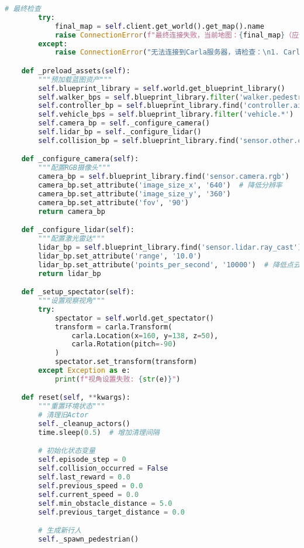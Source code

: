 \begin{lstlisting}[language=Python]
        # 最终检查
        try:
            final_map = self.client.get_world().get_map().name
            raise ConnectionError(f"最终连接失败，当前地图：{final_map}（应使用Town01）")
        except:
            raise ConnectionError("无法连接到Carla服务器，请检查：\n1. Carla服务器是否运行\n2. 端口2000是否可用")

    def _preload_assets(self):
        """预加载蓝图资产"""
        self.blueprint_library = self.world.get_blueprint_library()
        self.walker_bps = self.blueprint_library.filter('walker.pedestrian.*')
        self.controller_bp = self.blueprint_library.find('controller.ai.walker')
        self.vehicle_bps = self.blueprint_library.filter('vehicle.*')
        self.camera_bp = self._configure_camera()
        self.lidar_bp = self._configure_lidar()
        self.collision_bp = self.blueprint_library.find('sensor.other.collision')

    def _configure_camera(self):
        """配置RGB摄像头"""
        camera_bp = self.blueprint_library.find('sensor.camera.rgb')
        camera_bp.set_attribute('image_size_x', '640')  # 降低分辨率
        camera_bp.set_attribute('image_size_y', '360')
        camera_bp.set_attribute('fov', '90')
        return camera_bp

    def _configure_lidar(self):
        """配置激光雷达"""
        lidar_bp = self.blueprint_library.find('sensor.lidar.ray_cast')
        lidar_bp.set_attribute('range', '10.0')
        lidar_bp.set_attribute('points_per_second', '10000')  # 降低点云密度
        return lidar_bp

    def _setup_spectator(self):
        """设置观察视角"""
        try:
            spectator = self.world.get_spectator()
            transform = carla.Transform(
                carla.Location(x=160, y=138, z=50),
                carla.Rotation(pitch=-90)
            )
            spectator.set_transform(transform)
        except Exception as e:
            print(f"视角设置失败: {str(e)}")

    def reset(self, **kwargs):
        """重置环境状态"""
        # 清理旧Actor
        self._cleanup_actors()
        time.sleep(0.5)  # 增加清理间隔

        # 初始化状态变量
        self.episode_step = 0
        self.collision_occurred = False
        self.last_reward = 0.0
        self.previous_speed = 0.0
        self.current_speed = 0.0
        self.min_obstacle_distance = 5.0
        self.previous_target_distance = 0.0

        # 生成新行人
        self._spawn_pedestrian()


\end{lstlisting}
